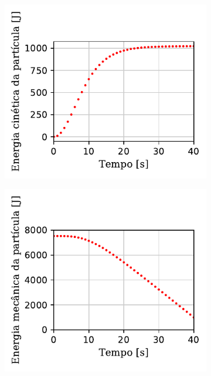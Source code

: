 \begin{figure}[htb!]
{\begin{subfigure}[t]{\smallresultsfigwidth}
			\caption{}
			\label{subfig:falling_with_drag:speed}
		\end{subfigure}
		\begin{subfigure}[t]{\smallresultsfigwidth}
			\centering
			\includegraphics[scale=1]{images/falling_with_drag/kinetic_energy_small.pdf}
			\caption{}
			\label{subfig:falling_with_drag:kinetic_energy}
		\end{subfigure}
		\begin{subfigure}[t]{\smallresultsfigwidth}
			\centering
			\includegraphics[scale=1]{images/falling_with_drag/mechanical_energy_small.pdf}
			\caption{}
			\label{subfig:falling_with_drag:mechanical_energy}
		\end{subfigure}
	}
	\label{fig:falling_with_drag:results}
	\sourceMe
\end{figure}

